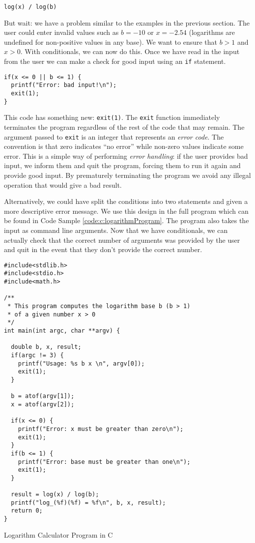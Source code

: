   \texttt{log(x) / log(b)}
  
But wait: we have a problem similar to the examples in the previous section.  
The user could enter invalid values such as $b = -10$ or $x = -2.54$ 
(logarithms are undefined for non-positive values in any base).  We want
to ensure that $b > 1$ and $x > 0$.  With conditionals, we can now do this.  
Once we have read in the input from the user we can make a check for
good input using an \texttt{if} statement.

\begin{verbatim}
if(x <= 0 || b <= 1) {
  printf("Error: bad input!\n");
  exit(1);
}
\end{verbatim}

This code has something new: \texttt{exit(1)}.  The \texttt{exit}
function immediately terminates the program regardless of the rest of the
code that may remain.  The argument passed to \texttt{exit} is an 
integer that represents an \emph{error code}.  The convention is that 
zero indicates ``no error'' while non-zero values indicate some error.  This
is a simple way of performing \emph{error handling}: if the user provides
bad input, we inform them and quit the program, forcing them to run it
again and provide good input.  By prematurely terminating the program
we avoid any illegal operation that would give a bad result.

Alternatively, we could have split the conditions into two statements and given
a more descriptive error message.  We use this design in the full program 
which can be found in Code Sample \ref{code:c:logarithmProgram}.  The 
program also takes the input as command line arguments.  Now that we have
conditionals, we can actually check that the correct number of arguments
was provided by the user and quit in the event that they don't provide
the correct number.

\begin{listing}[h]
\begin{verbatim}
#include<stdlib.h>
#include<stdio.h>
#include<math.h>

/**
 * This program computes the logarithm base b (b > 1) 
 * of a given number x > 0
 */
int main(int argc, char **argv) {

  double b, x, result;
  if(argc != 3) {
    printf("Usage: %s b x \n", argv[0]);
    exit(1);
  }  
  
  b = atof(argv[1]);
  x = atof(argv[2]);

  if(x <= 0) {
    printf("Error: x must be greater than zero\n");
    exit(1);
  }
  if(b <= 1) {
    printf("Error: base must be greater than one\n");
    exit(1);
  }

  result = log(x) / log(b);
  printf("log_(%f)(%f) = %f\n", b, x, result);
  return 0;
}
\end{verbatim}
\caption{Logarithm Calculator Program in C}
\label{code:c:logarithmProgram}
\end{listing}

